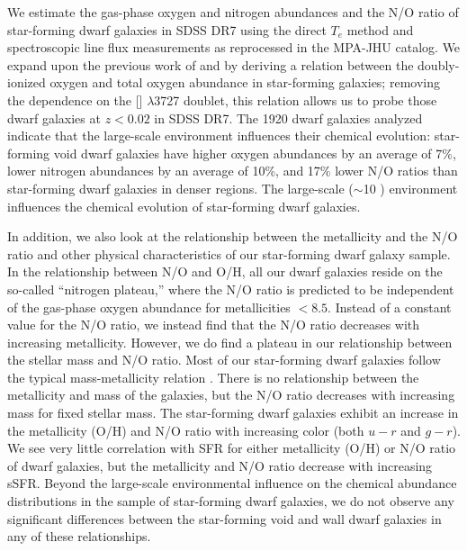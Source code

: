 We estimate the gas-phase oxygen and nitrogen abundances and the N/O ratio of 
star-forming dwarf galaxies in SDSS DR7 using the direct $T_e$ method and 
spectroscopic line flux measurements as reprocessed in the MPA-JHU catalog.  We 
expand upon the previous work of \cite{Douglass17a} and \cite{Douglass17b} by 
deriving a relation between the doubly-ionized oxygen and total oxygen abundance 
in star-forming galaxies; removing the dependence on the [] 
$\lambda$3727 doublet, this relation allows us to probe those dwarf galaxies at 
$z < 0.02$ in SDSS DR7.  The 1920 dwarf galaxies analyzed indicate that the 
large-scale environment influences their chemical evolution: star-forming void 
dwarf galaxies have higher oxygen abundances by an average of 7\%, lower 
nitrogen abundances by an average of 10\%, and 17\% lower N/O ratios than 
star-forming dwarf galaxies in denser regions.  The large-scale ($\sim$10 \hMpc) 
environment influences the chemical evolution of star-forming dwarf galaxies.

In addition, we also look at the relationship between the metallicity and the 
N/O ratio and other physical characteristics of our star-forming dwarf galaxy 
sample.  In the relationship between N/O and O/H, all our dwarf galaxies reside 
on the so-called ``nitrogen plateau,'' where the N/O ratio is predicted to be 
independent of the gas-phase oxygen abundance for metallicities \OH $< 8.5$.  
Instead of a constant value for the N/O ratio, we instead find that the N/O 
ratio decreases with increasing metallicity.  However, we do find a plateau in 
our relationship between the stellar mass and N/O ratio.  Most of our 
star-forming dwarf galaxies follow the typical mass-metallicity relation 
\citep{Tremonti04}.  There is no relationship between the metallicity and 
 mass of the galaxies, but the N/O ratio decreases with increasing 
 mass for fixed stellar mass.  The star-forming dwarf galaxies exhibit 
an increase in the metallicity (O/H) and N/O ratio with increasing color (both 
$u-r$ and $g-r$).  We see very little correlation with SFR for either 
metallicity (O/H) or N/O ratio of dwarf galaxies, but the metallicity and N/O 
ratio decrease with increasing sSFR.  Beyond the large-scale environmental 
influence on the chemical abundance distributions in the sample of star-forming 
dwarf galaxies, we do not observe any significant differences between the 
star-forming void and wall dwarf galaxies in any of these relationships.

